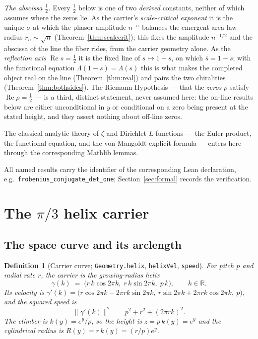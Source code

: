 \documentclass[11pt]{article}
\newtheorem{definition}{Definition}[section]
\DeclareMathOperator{\Ree}{Re}
\newcommand{\R}{\mathbb{R}}
\newcommand{\conj}[1]{\overline{#1}}
\newcommand{\code}[1]{\texttt{#1}}
\begin{document}
\medskip
\noindent\emph{The abscissa $\tfrac12$.} Every $\tfrac12$ below is one of two \emph{derived}
constants, neither of which assumes where the zeros lie. As the carrier's \emph{scale-critical
exponent} it is the unique $\sigma$ at which the phasor amplitude $n^{-\sigma}$ balances the emergent
area-law radius $r_n\sim\sqrt n$ (Theorem~\ref{thm:scalecrit}); this fixes the amplitude $n^{-1/2}$
and the abscissa of the line the fiber rides, from the carrier geometry alone. As the \emph{reflection
axis} $\Ree s=\tfrac12$ it is the fixed line of $s\mapsto 1-s$, on which $\conj s=1-s$; with the
functional equation $\Lambda(1-s)=\Lambda(s)$ this is what makes the completed object real on the line
(Theorem~\ref{thm:real}) and pairs the two chiralities (Theorem~\ref{thm:bothsides}). The Riemann
Hypothesis --- that the \emph{zeros} $\rho$ satisfy $\Ree\rho=\tfrac12$ --- is a third, distinct
statement, never assumed here: the on-line results below are either unconditional in $y$ or
conditional on a zero being present at the stated height, and they assert nothing about off-line
zeros.

The classical analytic theory of $\zeta$ and Dirichlet $L$-functions --- the Euler product, the
functional equation, and the von Mangoldt explicit formula
\cite{Riemann1859,Edwards1974,Titchmarsh1986,Davenport2000,IwaniecKowalski2004,MontgomeryVaughan2007}
--- enters here through the corresponding Mathlib lemmas.

All named results carry the identifier of the corresponding Lean declaration, e.g.\
\code{frobenius\_conjugate\_det\_one}; Section~\ref{sec:formal} records the verification.

\section{The $\pi/3$ helix carrier}\label{sec:carrier}

\subsection{The space curve and its arclength}

\begin{definition}[Carrier curve; \code{Geometry.helix}, \code{helixVel}, \code{speed}]\label{def:helix}
For pitch $p$ and radial rate $r$, the carrier is the growing-radius helix
\[
  \gamma(k) \;=\; \bigl(r\,k\cos 2\pi k,\; r\,k\sin 2\pi k,\; p\,k\bigr),\qquad k\in\R .
\]
Its velocity is $\gamma'(k)=\bigl(r\cos2\pi k-2\pi r k\sin2\pi k,\ r\sin2\pi k+2\pi r k\cos2\pi k,\ p\bigr)$,
and the squared speed is
\[
  \|\gamma'(k)\|^2 \;=\; p^2+r^2+(2\pi r k)^2 .
\]
The \emph{climber} is $k(y)=e^{y}/p$, so the height is $z=p\,k(y)=e^{y}$ and the cylindrical radius
is $R(y)=r\,k(y)=(r/p)e^{y}$.
\end{definition}
\end{document}
